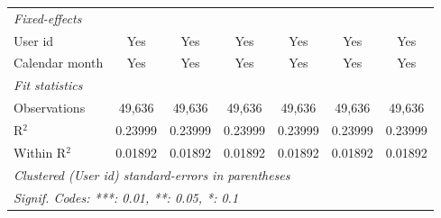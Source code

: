 \begin{table}[htbp]
\begin{footnotesize}
\begin{tabular}{lcccccc}
         \midrule \emph{Fixed-effects} &   &   &   &   &   &  \\
         User id                     & Yes           & Yes           & Yes           & Yes           & Yes           & Yes\\
         Calendar month              & Yes           & Yes           & Yes           & Yes           & Yes           & Yes\\
         \midrule \emph{Fit statistics} &   &   &   &   &   &  \\
         Observations                & 49,636        & 49,636        & 49,636        & 49,636        & 49,636        & 49,636\\
         R$^2$                       & 0.23999       & 0.23999       & 0.23999       & 0.23999       & 0.23999       & 0.23999\\
         Within R$^2$                & 0.01892       & 0.01892       & 0.01892       & 0.01892       & 0.01892       & 0.01892\\
         \midrule\midrule\multicolumn{7}{l}{\emph{Clustered (User id) standard-errors in parentheses}}\\
         \multicolumn{7}{l}{\emph{Signif. Codes: ***: 0.01, **: 0.05, *: 0.1}}\\
      \end{tabular}
   \end{footnotesize}
\end{table}


